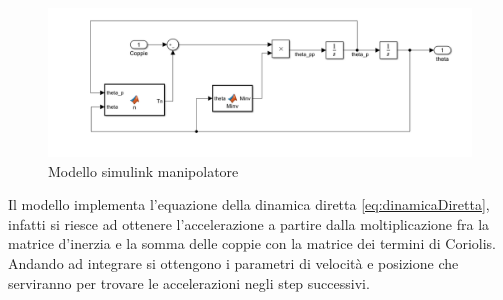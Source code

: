 \begin{figure}[ht]
	\begin{center}
		\includegraphics[scale=0.55]{Immagini/Dinamica/ModSimulink}
		\caption{Modello simulink manipolatore}
	\end{center}
\end{figure}
Il modello implementa l'equazione della dinamica diretta \ref{eq:dinamicaDiretta}, infatti si riesce ad ottenere l'accelerazione a partire dalla moltiplicazione fra la matrice d'inerzia e la somma delle coppie con la matrice dei termini di Coriolis. Andando ad integrare si ottengono i parametri di velocità e posizione che serviranno per trovare le accelerazioni negli step successivi.
